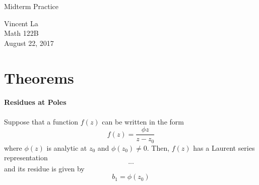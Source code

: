 \documentclass[11pt]{article}
\title{ }
\begin{document}
	\begin{center}	%
		\Large{Midterm Practice}	%
	\end{center}
	\begin{center}
		Vincent La \\
		Math 122B \\
		August 22, 2017
	\end{center}
	
\section{Theorems}
\paragraph{Residues at Poles}
Suppose that a function $f(z)$ can be written in the form
\[f(z) = \frac{\phi{z}}{z - z_0} \]
where $\phi(z)$ is analytic at $z_0$ and $\phi(z_0) \neq 0$. Then, $f(z)$ has a Laurent series representation
\[...\]
and its residue is given by
\[b_1 = \phi(z_0) \]
	
\end{document}
